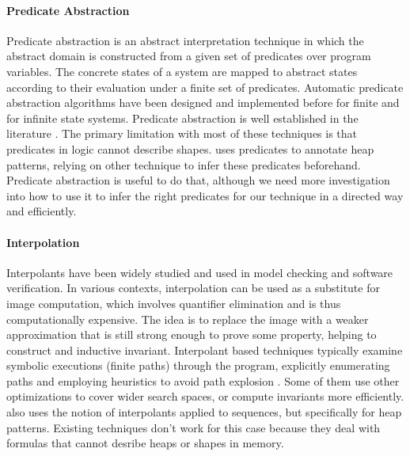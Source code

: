 \paragraph{Predicate Abstraction}
Predicate abstraction is an abstract interpretation technique in which the abstract
domain is constructed from a given set of predicates over program variables. The concrete
states of a system are mapped to abstract states according to their evaluation under a
finite set of predicates. Automatic predicate abstraction algorithms have been designed
and implemented before for finite and for infinite state systems. Predicate abstraction
is well established in the literature \cite{ball01,henzinger02,henzinger04}. The primary
limitation with most of these techniques is that predicates in logic cannot describe
shapes.
\verifier uses predicates to annotate heap patterns, relying on other technique to infer
these predicates beforehand. Predicate abstraction is useful to do that, although we
need more investigation into how to use it to infer the right predicates for our
technique in a directed way and efficiently.

\paragraph{Interpolation}
Interpolants have been widely studied and used in model checking and software
verification. In various contexts, interpolation can be used as a substitute for image
computation, which involves quantifier elimination and is thus computationally
expensive. The idea is to replace the image with a weaker approximation that is still
strong enough to prove some property, helping to construct and inductive invariant.
Interpolant based techniques typically examine symbolic executions (finite paths)
through the program, explicitly enumerating paths and employing heuristics to avoid path
explosion \cite{albarghouthi12,heizmann10,mcmillan06,rummer13}. Some of them use other
optimizations to cover wider search spaces, or compute invariants more efficiently.
\verifier also uses the notion of interpolants applied to sequences, but specifically
for heap patterns. Existing techniques don't work for this case because they deal with
formulas that cannot desribe heaps or shapes in memory.

